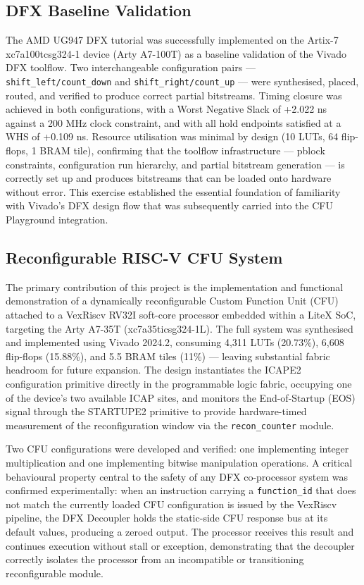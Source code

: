\subsection{DFX Baseline Validation}

The AMD UG947 DFX tutorial was successfully implemented on the Artix-7 xc7a100tcsg324-1 device (Arty A7-100T) as a baseline validation of the Vivado DFX toolflow. Two interchangeable configuration pairs — \texttt{shift\_left/count\_down} and \texttt{shift\_right/count\_up} — were synthesised, placed, routed, and verified to produce correct partial bitstreams. Timing closure was achieved in both configurations, with a Worst Negative Slack of +2.022 ns against a 200 MHz clock constraint, and with all hold endpoints satisfied at a WHS of +0.109 ns. Resource utilisation was minimal by design (10 LUTs, 64 flip-flops, 1 BRAM tile), confirming that the toolflow infrastructure — pblock constraints, configuration run hierarchy, and partial bitstream generation — is correctly set up and produces bitstreams that can be loaded onto hardware without error. This exercise established the essential foundation of familiarity with Vivado's DFX design flow that was subsequently carried into the CFU Playground integration.

\subsection{Reconfigurable RISC-V CFU System}

The primary contribution of this project is the implementation and functional demonstration of a dynamically reconfigurable Custom Function Unit (CFU) attached to a VexRiscv RV32I soft-core processor embedded within a LiteX SoC, targeting the Arty A7-35T (xc7a35ticsg324-1L). The full system was synthesised and implemented using Vivado 2024.2, consuming 4,311 LUTs (20.73\%), 6,608 flip-flops (15.88\%), and 5.5 BRAM tiles (11\%) — leaving substantial fabric headroom for future expansion. The design instantiates the ICAPE2 configuration primitive directly in the programmable logic fabric, occupying one of the device's two available ICAP sites, and monitors the End-of-Startup (EOS) signal through the STARTUPE2 primitive to provide hardware-timed measurement of the reconfiguration window via the \texttt{recon\_counter} module.

Two CFU configurations were developed and verified: one implementing integer multiplication and one implementing bitwise manipulation operations. A critical behavioural property central to the safety of any DFX co-processor system was confirmed experimentally: when an instruction carrying a \texttt{function\_id} that does not match the currently loaded CFU configuration is issued by the VexRiscv pipeline, the DFX Decoupler holds the static-side CFU response bus at its default values, producing a zeroed output. The processor receives this result and continues execution without stall or exception, demonstrating that the decoupler correctly isolates the processor from an incompatible or transitioning reconfigurable module.

